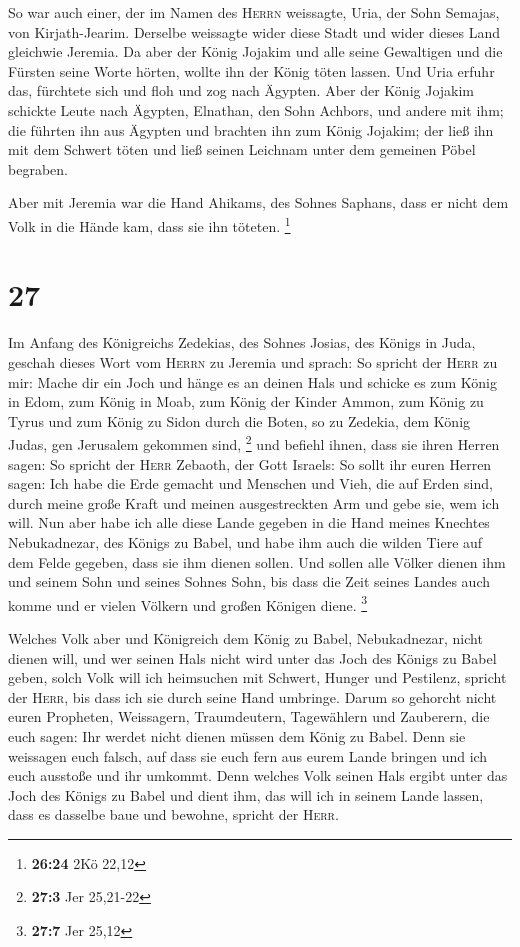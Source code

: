 So war auch einer, der im Namen des \textsc{Herrn}
weissagte, Uria, der Sohn Semajas, von Kirjath-Jearim. Derselbe
weissagte wider diese Stadt und wider dieses Land gleichwie Jeremia.
 Da aber der König Jojakim und alle seine Gewaltigen und
die Fürsten seine Worte hörten, wollte ihn der König töten lassen. Und
Uria erfuhr das, fürchtete sich und floh und zog nach Ägypten.
 Aber der König Jojakim schickte Leute nach Ägypten,
Elnathan, den Sohn Achbors, und andere mit ihm;  die
führten ihn aus Ägypten und brachten ihn zum König Jojakim; der ließ ihn
mit dem Schwert töten und ließ seinen Leichnam unter dem gemeinen Pöbel
begraben.

 Aber mit Jeremia war die Hand Ahikams, des Sohnes
Saphans, dass er nicht dem Volk in die Hände kam, dass sie ihn töteten.
\footnote{\textbf{26:24} 2Kö 22,12}

\hypertarget{section-6}{%
\section{27}\label{section-6}}

 Im Anfang des Königreichs Zedekias, des Sohnes Josias,
des Königs in Juda, geschah dieses Wort vom \textsc{Herrn} zu Jeremia
und sprach:  So spricht der \textsc{Herr} zu mir: Mache
dir ein Joch und hänge es an deinen Hals  und schicke es
zum König in Edom, zum König in Moab, zum König der Kinder Ammon, zum
König zu Tyrus und zum König zu Sidon durch die Boten, so zu Zedekia,
dem König Judas, gen Jerusalem gekommen sind, \footnote{\textbf{27:3}
  Jer 25,21-22}  und befiehl ihnen, dass sie ihren Herren
sagen: So spricht der \textsc{Herr} Zebaoth, der Gott Israels: So sollt
ihr euren Herren sagen:  Ich habe die Erde gemacht und
Menschen und Vieh, die auf Erden sind, durch meine große Kraft und
meinen ausgestreckten Arm und gebe sie, wem ich will.  Nun
aber habe ich alle diese Lande gegeben in die Hand meines Knechtes
Nebukadnezar, des Königs zu Babel, und habe ihm auch die wilden Tiere
auf dem Felde gegeben, dass sie ihm dienen sollen.  Und
sollen alle Völker dienen ihm und seinem Sohn und seines Sohnes Sohn,
bis dass die Zeit seines Landes auch komme und er vielen Völkern und
großen Königen diene. \footnote{\textbf{27:7} Jer 25,12}

 Welches Volk aber und Königreich dem König zu Babel,
Nebukadnezar, nicht dienen will, und wer seinen Hals nicht wird unter
das Joch des Königs zu Babel geben, solch Volk will ich heimsuchen mit
Schwert, Hunger und Pestilenz, spricht der \textsc{Herr}, bis dass ich
sie durch seine Hand umbringe.  Darum so gehorcht nicht
euren Propheten, Weissagern, Traumdeutern, Tagewählern und Zauberern,
die euch sagen: Ihr werdet nicht dienen müssen dem König zu Babel.
 Denn sie weissagen euch falsch, auf dass sie euch fern
aus eurem Lande bringen und ich euch ausstoße und ihr umkommt.
 Denn welches Volk seinen Hals ergibt unter das Joch des
Königs zu Babel und dient ihm, das will ich in seinem Lande lassen, dass
es dasselbe baue und bewohne, spricht der \textsc{Herr}.

